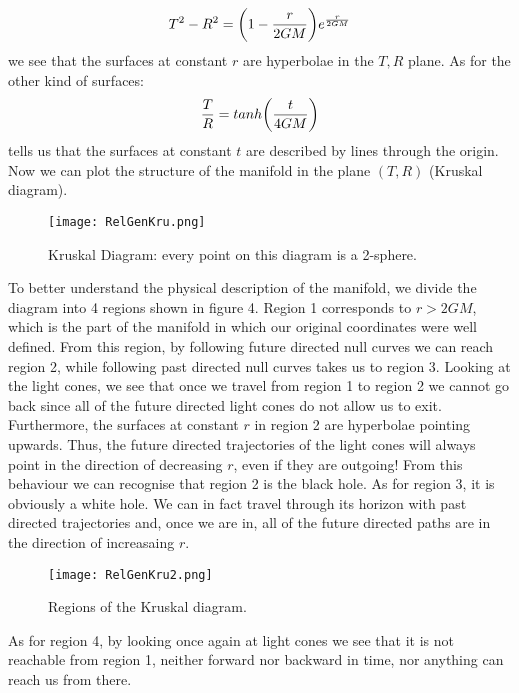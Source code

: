 \documentclass[]{article}
\theoremstyle{definition}
\theoremstyle{Theorem}
\theoremstyle{definition}
\theoremstyle{definition}
\theoremstyle{definition}
\begin{document}
$$T^2-R^2=\bigg(1-{r\over 2GM}\bigg)e^{r\over 2GM}$$
we see that the surfaces at constant $r$ are hyperbolae in the $T,R$ plane. As for the other kind of surfaces:
$${T\over R}=tanh\bigg({t\over 4GM}\bigg)$$
tells us that the surfaces at constant $t$ are described by lines through the origin. Now we can plot the structure of the manifold in the plane $(T,R)$ (Kruskal diagram).
\begin{center}
	\begin{figure}[h!]
		\centering
		\texttt{[image: RelGenKru.png]}
		\caption{Kruskal Diagram: every point on this diagram is a 2-sphere.}
	\end{figure}
\end{center}
To better understand the physical description of the manifold, we divide the diagram into 4 regions shown in figure 4. Region 1 corresponds to $r>2GM$, which is the part of the manifold in which our original coordinates were well defined. From this region, by following future directed null curves we can reach region 2, while following past directed null curves takes us to region 3. Looking at the light cones, we see that once we travel from region 1 to region 2 we cannot go back since all of the future directed light cones do not allow us to exit. Furthermore, the surfaces at constant $r$ in region 2 are hyperbolae pointing upwards. Thus, the future directed trajectories of the light cones will always point in the direction of decreasing $r$, even if they are outgoing! From this behaviour we can recognise that region 2 is the black hole. As for region 3, it is obviously a white hole. We can in fact travel through its horizon with past directed trajectories and, once we are in, all of the future directed paths are in the direction of increasaing $r$.
\begin{center}
	\begin{figure}[h!]
		\centering
		\texttt{[image: RelGenKru2.png]}
		\caption{Regions of the Kruskal diagram.}
	\end{figure}
\end{center}
As for region 4, by looking once again at light cones we see that it is not reachable from region 1, neither forward nor backward in time, nor anything can reach us from there.
\end{document}
